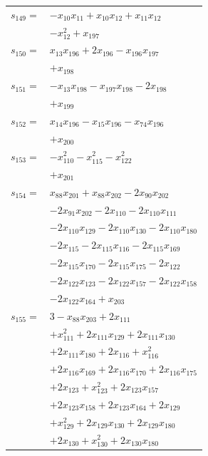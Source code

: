 \begin{longtable}{@{}r@{\;}l@{}}
\(s_{149}=\) & \(\displaystyle -x_{10}x_{11} +x_{10}x_{12} +x_{11}x_{12}\) \\
 & \(\displaystyle -x_{12}^{2} +x_{197}\) \\[3pt]
\(s_{150}=\) & \(\displaystyle x_{13}x_{196} +2x_{196} -x_{196}x_{197}\) \\
 & \(\displaystyle +x_{198}\) \\[3pt]
\(s_{151}=\) & \(\displaystyle -x_{13}x_{198} -x_{197}x_{198} -2x_{198}\) \\
 & \(\displaystyle +x_{199}\) \\[3pt]
\(s_{152}=\) & \(\displaystyle x_{14}x_{196} -x_{15}x_{196} -x_{74}x_{196}\) \\
 & \(\displaystyle +x_{200}\) \\[3pt]
\(s_{153}=\) & \(\displaystyle -x_{110}^{2} -x_{115}^{2} -x_{122}^{2}\) \\
 & \(\displaystyle +x_{201}\) \\[3pt]
\(s_{154}=\) & \(\displaystyle x_{88}x_{201} +x_{88}x_{202} -2x_{90}x_{202}\) \\
 & \(\displaystyle -2x_{91}x_{202} -2x_{110} -2x_{110}x_{111}\) \\
 & \(\displaystyle -2x_{110}x_{129} -2x_{110}x_{130} -2x_{110}x_{180}\) \\
 & \(\displaystyle -2x_{115} -2x_{115}x_{116} -2x_{115}x_{169}\) \\
 & \(\displaystyle -2x_{115}x_{170} -2x_{115}x_{175} -2x_{122}\) \\
 & \(\displaystyle -2x_{122}x_{123} -2x_{122}x_{157} -2x_{122}x_{158}\) \\
 & \(\displaystyle -2x_{122}x_{164} +x_{203}\) \\[3pt]
\(s_{155}=\) & \(\displaystyle 3 -x_{88}x_{203} +2x_{111}\) \\
 & \(\displaystyle +x_{111}^{2} +2x_{111}x_{129} +2x_{111}x_{130}\) \\
 & \(\displaystyle +2x_{111}x_{180} +2x_{116} +x_{116}^{2}\) \\
 & \(\displaystyle +2x_{116}x_{169} +2x_{116}x_{170} +2x_{116}x_{175}\) \\
 & \(\displaystyle +2x_{123} +x_{123}^{2} +2x_{123}x_{157}\) \\
 & \(\displaystyle +2x_{123}x_{158} +2x_{123}x_{164} +2x_{129}\) \\
 & \(\displaystyle +x_{129}^{2} +2x_{129}x_{130} +2x_{129}x_{180}\) \\
 & \(\displaystyle +2x_{130} +x_{130}^{2} +2x_{130}x_{180}\) \\

\end{longtable}
